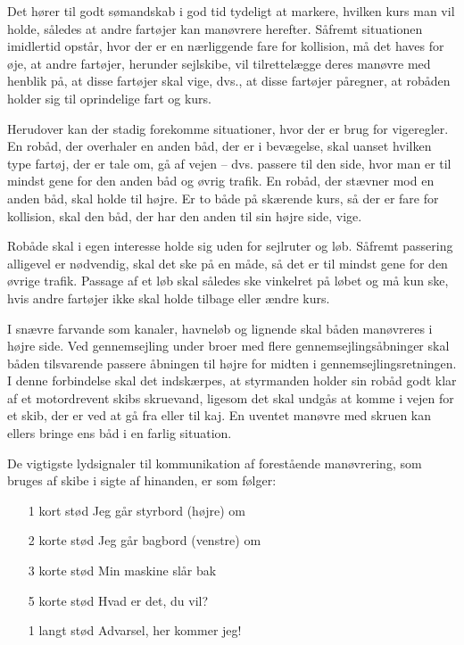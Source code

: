 \documentclass{article}
\begin{document}
Det hører til godt sømandskab i god tid tydeligt at markere, hvilken kurs
man vil holde, således at andre fartøjer kan manøvrere herefter. Såfremt
situationen imidlertid opstår, hvor der er en nærliggende fare for
kollision, må det haves for øje, at andre fartøjer, herunder sejlskibe,
vil tilrettelægge deres manøvre med henblik på, at disse fartøjer skal
vige, dvs., at disse fartøjer påregner, at robåden holder sig til
oprindelige fart og kurs.

Herudover kan der stadig forekomme situationer, hvor der er brug for
vigeregler. En robåd, der overhaler en anden båd, der er i bevægelse,
skal uanset hvilken type fartøj, der er tale om, gå af vejen – dvs.
passere til den side, hvor man er til mindst gene for den anden båd og
øvrig trafik. En robåd, der stævner mod en anden båd, skal holde til
højre. Er to både på skærende kurs, så der er fare for kollision, skal
den båd, der har den anden til sin højre side, vige.

Robåde skal i egen interesse holde sig uden for sejlruter og løb. Såfremt
passering alligevel er nødvendig, skal det ske på en måde, så det er til
mindst gene for den øvrige trafik. Passage af et løb skal således ske
vinkelret på løbet og må kun ske, hvis andre fartøjer ikke skal holde
tilbage eller ændre kurs.

I snævre farvande som kanaler, havneløb og lignende skal båden manøvreres
i højre side. Ved gennemsejling under broer med flere
gennemsejlingsåbninger skal båden tilsvarende passere åbningen til højre
for midten i gennemsejlingsretningen.  I denne forbindelse skal det
indskærpes, at styrmanden holder sin robåd godt klar af et motordrevent
skibs skruevand, ligesom det skal undgås at komme i vejen for et skib,
der er ved at gå fra eller til kaj. En uventet manøvre med skruen kan
ellers bringe ens båd i en farlig situation.

De vigtigste lydsignaler til kommunikation af forestående manøvrering,
som bruges af skibe i sigte af hinanden, er som følger:

\begin{itemize} \item[1 kort stød] Jeg går styrbord (højre) om \item[2
        korte stød] Jeg går bagbord (venstre) om \item[3 korte stød] Min
        maskine slår bak \item[5 korte stød] Hvad er det, du vil?
        \item[1 langt stød] Advarsel, her kommer jeg!  \end{itemize}
\end{document}
